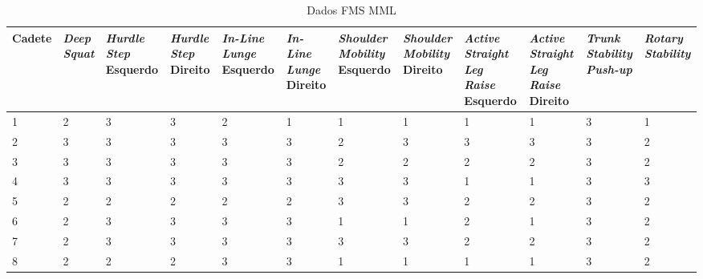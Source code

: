 \begin{landscape}
    
    \begin{table}[h]
        \centering
        \caption{Dados FMS \acrlong{MML}}
        \label{tab:fmsMML}
        \renewcommand{\arraystretch}{1.3}  %
        \begin{adjustbox}{scale=0.9}
        \begin{tabular}{|p{1.8cm}|p{1.6cm}|p{1.6cm}|p{1.6cm}|p{1.6cm}|p{1.6cm}|p{1.6cm}|p{1.6cm}|p{1.6cm}|p{1.6cm}|p{1.6cm}|p{1.6cm}|}
            \hline
            \textbf{Cadete} & \textbf{\textit{Deep Squat}} & \textbf{\textit{Hurdle Step} Esquerdo} & \textbf{\textit{Hurdle Step} Direito} & \textbf{\textit{In-Line Lunge} Esquerdo} & \textbf{\textit{In-Line Lunge} Direito} & \textbf{\textit{Shoulder Mobility} Esquerdo} & \textbf{\textit{Shoulder Mobility} Direito} & \textbf{\textit{Active Straight Leg Raise} Esquerdo} & \textbf{\textit{Active Straight Leg Raise} Direito} & \textbf{\textit{Trunk Stability Push-up}} & \textbf{\textit{Rotary Stability}} \\
            \hline
            1 & 2 & 3 & 3 & 2 & 1 & 1 & 1 & 1 & 1 & 3 & 1 \\
            2 & 3 & 3 & 3 & 3 & 3 & 2 & 3 & 3 & 3 & 3 & 2 \\
            3 & 3 & 3 & 3 & 3 & 3 & 2 & 2 & 2 & 2 & 3 & 2 \\
            4 & 3 & 3 & 3 & 3 & 3 & 3 & 3 & 1 & 1 & 3 & 3 \\
            5 & 2 & 2 & 2 & 2 & 2 & 3 & 3 & 2 & 2 & 3 & 2 \\
            6 & 2 & 3 & 3 & 3 & 3 & 1 & 1 & 2 & 1 & 3 & 2 \\
            7 & 2 & 3 & 3 & 3 & 3 & 3 & 3 & 2 & 2 & 3 & 2 \\
            8 & 2 & 2 & 2 & 3 & 3 & 1 & 1 & 1 & 1 & 3 & 2 \\
            \hline
        \end{tabular}
        \end{adjustbox}
    \end{table}
    
    

\end{landscape}